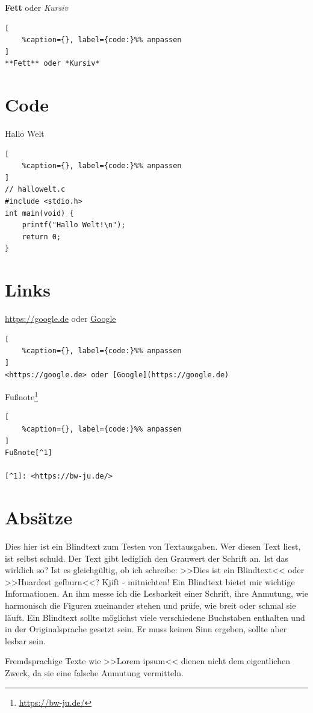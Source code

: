 \textbf{Fett} oder \emph{Kursiv}

\lstset{language=Python}%
\begin{lstlisting}[
	%caption={}, label={code:}%% anpassen
]
**Fett** oder *Kursiv*
\end{lstlisting}

\section{Code}\label{code}

Hallo Welt %

\lstset{language=Python}%
\begin{lstlisting}[
	%caption={}, label={code:}%% anpassen
]
// hallowelt.c
#include <stdio.h>
int main(void) {
    printf("Hallo Welt!\n");
    return 0;
}
\end{lstlisting}

\section{Links}\label{links}

\url{https://google.de} oder \href{https://google.de}{Google}

\lstset{language=Python}%
\begin{lstlisting}[
	%caption={}, label={code:}%% anpassen
]
<https://google.de> oder [Google](https://google.de)
\end{lstlisting}

Fußnote\footnote{\url{https://bw-ju.de/}}

\lstset{language=Python}%
\begin{lstlisting}[
	%caption={}, label={code:}%% anpassen
]
Fußnote[^1]       

[^1]: <https://bw-ju.de/>
\end{lstlisting}

\section{Absätze}\label{absaetze}

Dies hier ist ein Blindtext zum Testen von Textausgaben. Wer diesen Text
liest, ist selbst schuld. Der Text gibt lediglich den Grauwert der
Schrift an. Ist das wirklich so? Ist es gleichgültig, ob ich schreibe:
>>Dies ist ein Blindtext<< oder >>Huardest gefburn<<? Kjift -
mitnichten! Ein Blindtext bietet mir wichtige Informationen. An ihm
messe ich die Lesbarkeit einer Schrift, ihre Anmutung, wie harmonisch
die Figuren zueinander stehen und prüfe, wie breit oder schmal sie
läuft. Ein Blindtext sollte möglichst viele verschiedene Buchstaben
enthalten und in der Originalsprache gesetzt sein. Er muss keinen Sinn
ergeben, sollte aber lesbar sein.

Fremdsprachige Texte wie >>Lorem ipsum<< dienen nicht dem eigentlichen
Zweck, da sie eine falsche Anmutung vermitteln.
